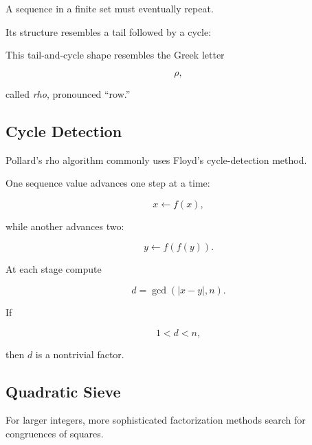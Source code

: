A sequence in a finite set must eventually repeat.

Its structure resembles a tail followed by a cycle:

\begin{centereddiagram}
\end{centereddiagram}

This tail-and-cycle shape resembles the Greek letter

\[ \rho, \]

called \emph{rho}, pronounced ``row.''

\subsection{Cycle Detection}
\label{subsec:pollard-cycle-detection}

Pollard's rho algorithm commonly uses Floyd's cycle-detection method.

One sequence value advances one step at a time:

\[ x\leftarrow f(x), \]

while another advances two:

\[ y\leftarrow f(f(y)). \]

At each stage compute

\[ d=\gcd(|x-y|,n). \]

If

\[ 1<d<n, \]

then \(d\) is a nontrivial factor.

\subsection{Quadratic Sieve}
\label{subsec:quadratic-sieve}

For larger integers, more sophisticated factorization methods search for
congruences of squares.

